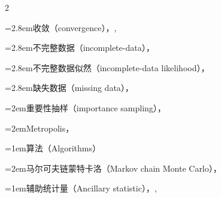 \begin{multicols}{2}
\par\noindent\hangindent=2.8em\hspace*{1.8em}\label{idx:10}收敛（convergence），\hyperref[thm:7.2.20]{\pageref*{thm:7.2.20}}, \hyperref[thm:7.5.2]{\pageref*{thm:7.5.2}}\par
\par\noindent\hangindent=2.8em\hspace*{1.8em}\label{idx:11}不完整数据（incomplete-data），\hyperref[idxocc:11:295]{\pageref*{idxocc:11:295}}\par
\par\noindent\hangindent=2.8em\hspace*{1.8em}\label{idx:12}不完整数据似然（incomplete-data likelihood），\hyperref[eq:7.2.13]{\pageref*{eq:7.2.13}}\par
\par\noindent\hangindent=2.8em\hspace*{1.8em}\label{idx:13}缺失数据（missing data），\hyperref[sec:7.2.4]{\pageref*{sec:7.2.4}}\par
\par\noindent\hangindent=2em\hspace*{1em}\label{idx:14}重要性抽样（importance sampling），\hyperref[exercise:5.64]{\pageref*{exercise:5.64}}\par
\par\noindent\hangindent=2em\hspace*{1em}\label{idx:15}Metropolis，\hyperref[idxocc:15:238]{\pageref*{idxocc:15:238}}\par
\par\addvspace{2pt}
\par\noindent\hangindent=1em\hspace*{0em}\label{idx:16}算法（Algorithms）\par
\par\noindent\hangindent=2em\hspace*{1em}\label{idx:17}马尔可夫链蒙特卡洛（Markov chain Monte Carlo），\hyperref[sec:5.8.5]{\pageref*{sec:5.8.5}}\par
\par\addvspace{2pt}
\par\noindent\hangindent=1em\hspace*{0em}\label{idx:18}辅助统计量（Ancillary statistic），\hyperref[def:6.2.16]{\pageref*{def:6.2.16}}, \hyperref[sec:6.6.2]{\pageref*{sec:6.6.2}}\par

\end{multicols}
